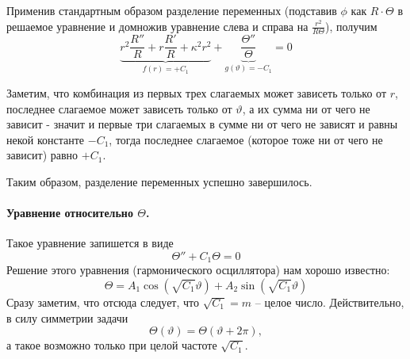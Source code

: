Применив стандартным образом разделение переменных (подставив $\phi$ как $R\cdot\Theta$ в решаемое уравнение и домножив уравнение слева и справа на $\frac{r^2}{R\Theta}$), получим
\begin{equation}
	\underbrace{r^2\frac{R''}{R}+r\frac{R'}{R}+\kappa^2r^2}_{f(r)=+C_1}+
	\underbrace{\frac{\Theta''}{\Theta}}_{g(\vartheta)=-C_1}
	=0
\end{equation}

Заметим, что комбинация из первых трех слагаемых может зависеть только от $r$, последнее слагаемое может зависеть только от $\vartheta$, а их сумма ни от чего не зависит - значит и первые три слагаемых в сумме ни от чего не зависят и равны некой константе $-C_1$, тогда последнее слагаемое (которое тоже ни от чего не зависит) равно $+C_1$.

Таким образом, разделение переменных успешно завершилось.
\paragraph{Уравнение относительно $\Theta$.}
Такое уравнение запишется в виде
\begin{equation}
	\Theta''+C_1\Theta=0
\end{equation}
Решение этого уравнения (гармонического осциллятора) нам хорошо известно:
\begin{equation}
	\Theta=A_1\cos(\sqrt{C_1}\vartheta)+A_2\sin(\sqrt{C_1}\vartheta)
\end{equation}
Сразу заметим, что отсюда следует, что $\sqrt{C_1}=m$ -- целое число. Действительно, в силу симметрии задачи
\begin{equation}
	\Theta(\vartheta)=\Theta(\vartheta+2\pi),
\end{equation}
а такое возможно только при целой частоте $\sqrt{C_1}$.

